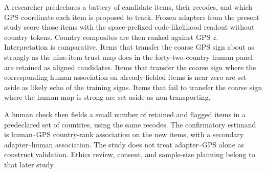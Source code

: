 A researcher predeclares a battery of candidate items, their recodes, and which GPS coordinate each item is proposed to track. Frozen adapters from the present study score those items with the space-prefixed code-likelihood readout without country tokens. Country composites are then ranked against GPS $z$. Interpretation is comparative. Items that transfer the coarse GPS sign about as strongly as the nine-item trust map does in the forty-two-country human panel are retained as aligned candidates. Items that transfer the coarse sign where the corresponding human association on already-fielded items is near zero are set aside as likely echo of the training signs. Items that fail to transfer the coarse sign where the human map is strong are set aside as non-transporting.

A human check then fields a small number of retained and flagged items in a predeclared set of countries, using the same recodes. The confirmatory estimand is human--GPS country-rank association on the new items, with a secondary adapter--human association. The study does not treat adapter--GPS alone as construct validation. Ethics review, consent, and sample-size planning belong to that later study.
